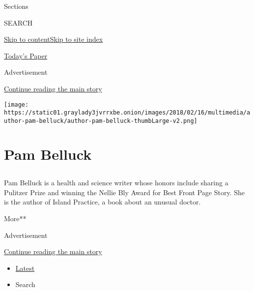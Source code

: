 Sections

SEARCH

\protect\hyperlink{site-content}{Skip to
content}\protect\hyperlink{site-index}{Skip to site index}

\href{https://myaccount.nytimes3xbfgragh.onion/auth/login?response_type=cookie\&client_id=vi}{}

\href{https://www.nytimes3xbfgragh.onion/section/todayspaper}{Today's
Paper}

Advertisement

\protect\hyperlink{after-top}{Continue reading the main story}

\texttt{[image: https://static01.graylady3jvrrxbe.onion/images/2018/02/16/multimedia/author-pam-belluck/author-pam-belluck-thumbLarge-v2.png]}

\hypertarget{pam-belluck}{%
\section{Pam Belluck}\label{pam-belluck}}

\hypertarget{section}{%
\subsection{}\label{section}}

Pam Belluck is a health and science writer whose honors include sharing
a Pulitzer Prize and winning the Nellie Bly Award for Best Front Page
Story. She is the author of Island Practice, a book about an unusual
doctor.

More**

Advertisement

\protect\hyperlink{after-mid1}{Continue reading the main story}

\begin{itemize}
\tightlist
\item
  \protect\hyperlink{stream-panel}{Latest}
\item
  Search
\end{itemize}

